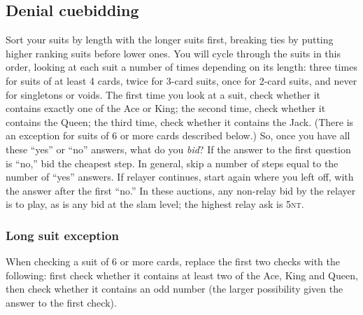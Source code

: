 \documentclass{amsart}
\newcommand{\nt}{\textsc{nt}}
\newcommand{\+}{\ensuremath{^+}}
\begin{document}
\subsection*{Denial cuebidding}
Sort your suits by length with the longer suits first, breaking ties
by putting higher ranking suits before lower ones.  You will cycle
through the suits in this order, looking at each suit a number of
times depending on its length: three times for suits of at least 4
cards, twice for 3-card suits, once for 2-card suits, and never for
singletons or voids.  The first time you look at a suit, check whether
it contains exactly one of the Ace or King; the second time, check
whether it contains the Queen; the third time, check whether it
contains the Jack.  (There is an exception for suits of 6 or more
cards described below.)  So, once you have all these ``yes'' or ``no''
answers, what do you \emph{bid}?  If the answer to the first question
is ``no,'' bid the cheapest step.  In general, skip a number of steps
equal to the number of ``yes'' answers.  If relayer continues, start
again where you left off, with the answer after the first ``no.''  In
these auctions, any non-relay bid by the relayer is to play, as is any
bid at the slam level; the highest relay ask is 5\nt.

\subsubsection*{Long suit exception}
When checking a suit of 6 or more cards, replace the first two checks
with the following: first check whether it contains at least two of
the Ace, King and Queen, then check whether it contains an odd number
(the larger possibility given the answer to the first check).
\end{document}
